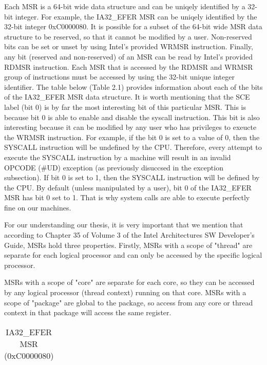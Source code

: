 \documentclass{report}
\begin{document}
\begin{spacing}{1.5}
{\large
Each MSR is a 64-bit wide data structure and can be uniqely identified by a 32-bit integer. For example, the IA32\_EFER MSR can be uniqely identified by the 32-bit integer 0xC0000080. It is possible for a subset of the 64-bit wide MSR data structure to be reserved, so that it cannot be modified by a user. Non-reserved bits can be set or unset by using Intel's provided WRMSR instruction. Finally, any bit (reserved and non-reserved) of an MSR can be read by Intel's provided RDMSR instruction. Each MSR that is accessed by the RDMSR and WRMSR group of instructions must be accessed by using the 32-bit unique integer identifier. The table below (Table 2.1) provides information about each of the bits of the IA32\_EFER MSR data structure. It is worth mentioning that the SCE label (bit 0) is by far the most interesting bit of this particular MSR. This is because bit 0 is able to enable and disable the syscall instruction. This bit is also interesting because it can be modified by any user who has privileges to exeucte the WRMSR instruction. For example, if the bit 0 is set to a value of 0, then the SYSCALL instruction will be undefined by the CPU. Therefore, every attempt to execute the SYSCALL instruction by a machine will result in an invalid OPCODE (\#UD) exception (as previously disuccsed in the exception subsection). If bit 0 is set to 1, then the SYSCALL instruction will be defined by the CPU. By default (unless manipulated by a user), bit 0 of the IA32\_EFER MSR has bit 0 set to 1. That is why system calls are able to execute perfectly fine on our machines.
\newline
}


{\large
For our understanding our thesis, it is very important that we mention that according to Chapter 35 of Volume 3 of the Intel Architectures SW Developer's Guide, MSRs hold three properties. Firstly, MSRs with a scope of "thread" are separate for each logical processor and can only be accessed by the specific logical processor.

MSRs with a scope of "core" are separate for each core, so they can be accessed by any logical processor (thread context) running on that core.
MSRs with a scope of "package" are global to the package, so access from any core or thread context in that package will access the same register.
\newline
}


\begin{longtable}{|l|l|l|}
\caption{IA32\_EFER MSR (0xC0000080)} \label{tab:long} \\


\end{longtable}
\end{spacing}
\end{document}
